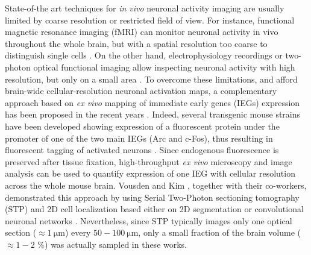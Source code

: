 \documentclass[smallextended]{svjour3}       %
\begin{document}
State-of-the art techniques for \emph{in vivo} neuronal activity imaging are usually limited by coarse
resolution or restricted field of view. For instance, functional magnetic resonance imaging (fMRI) can
monitor neuronal activity in vivo throughout the whole brain, but with a spatial resolution too coarse
to distinguish single cells \cite{logothetis_what_2008}. On the other hand, electrophysiology recordings
or two-photon optical functional imaging allow inspecting neuronal activity with high resolution, but
only on a small area \cite{kerr_imaging_2008}. To overcome these limitations, and afford brain-wide
cellular-resolution neuronal activation maps, a complementary approach based on \emph{ex vivo} mapping
of immediate early genes (IEGs) expression has been proposed in the recent years
\cite{vousden_whole-brain_2014,kim_mapping_2015}. Indeed, several transgenic mouse strains have been developed
showing expression of a fluorescent protein under the promoter of one of the two main IEGs (Arc and
c-Fos), thus resulting in fluorescent tagging of activated neurons
\cite{barth_visualizing_2007,eguchi_vivo_2009,guenthner_permanent_2013}. Since endogenous fluorescence is
preserved after tissue fixation, high-throughput \emph{ex vivo} microscopy and image analysis can be
used to quantify expression of one IEG with cellular resolution across the whole mouse brain. Vousden
\cite{vousden_whole-brain_2014} and Kim \cite{kim_mapping_2015}, together with their co-workers, demonstrated
this approach by using Serial Two-Photon sectioning tomography (STP) \cite{ragan_serial_2012} and 2D
cell localization based either on 2D segmentation \cite{vousden_whole-brain_2014} or convolutional neuronal
networks \cite{kim_mapping_2015}. Nevertheless, since STP typically images only one optical section
($\approx \SI{1}{\micro\meter}$) every $50-\SI{100}{\micro\meter}$, only a small fraction of the
brain volume ($\approx 1-2$ \%) was actually sampled in these works.
\end{document}

